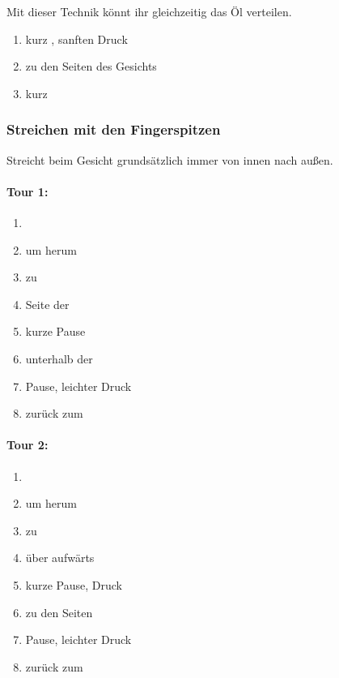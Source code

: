 Mit dieser Technik könnt ihr gleichzeitig das Öl verteilen.

\begin{enumerate}
  \item kurz , sanften Druck
  \item {} zu den Seiten des Gesichts
  \item kurz 
\end{enumerate}


\newpage
\subsubsection{Streichen mit den Fingerspitzen}

Streicht beim Gesicht grundsätzlich immer von innen nach außen.

\begin{multicols}{2}

\begin{oframed}
\paragraph{Tour 1:}
\begin{enumerate}
  \item {}
  \item um  herum
  \item zu 
  \item Seite der 
  \item {} kurze Pause
  \item unterhalb der 
  \item {} Pause, leichter Druck
  \item zurück zum 
\end{enumerate}
\end{oframed}

\columnbreak

\begin{oframed}
\paragraph{Tour 2:}
\begin{enumerate}
  \item {}
  \item um  herum
  \item zu 
  \item über  aufwärts
  \item {} kurze Pause, Druck
  \item {} zu den Seiten
  \item {} Pause, leichter Druck
  \item zurück zum 
\end{enumerate}
\end{oframed}

\end{multicols}


